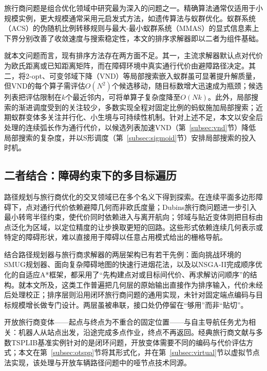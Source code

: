 \documentclass[lettersize,journal]{IEEEtran}
\begin{document}
旅行商问题是组合优化领域中研究最为深入的问题之一\cite{ref4,ref36}。精确算法通常仅适用于小规模实例，更大规模通常采用元启发式方法，如遗传算法\cite{ref19}与蚁群优化\cite{ref21,ref42}。蚁群系统（ACS）的伪随机比例转移规则\cite{ref22}与最大-最小蚁群系统（MMAS）的显式信息素上下界\cite{ref23}分别改善了收敛速度与搜索稳定性，本文的排序求解器即以二者为组件基础。

就本文问题而言，现有排序方法存在两方面不足。其一，主流求解器默认点对代价为欧氏距离或已知距离矩阵，而在障碍环境中真实通行代价由避障路径决定。其二，将2-opt、可变邻域下降（VND）等局部搜索嵌入蚁群虽可显著提升解质量\cite{ref24,ref25,ref43}，但VND的每个算子需评估$O(N^2)$个候选移动，随目标数增大迅速成为瓶颈；候选列表把评估限制在$k$个最近邻内，可将单算子复杂度降至$O(Nk)$\cite{ref26}。此外，局部搜索的渐进调度受到的关注较少，多数实现全程对固定比例的蚂蚁施加局部搜索；近期蚁群变体多关注并行化、小生境与可持续性机制\cite{ref27,ref28,ref29,ref30}。针对上述不足，本文以安全后处理的连续弧长作为通行代价，以候选列表加速VND（第~\ref{subsec:vnd}节）降低局部搜索的复杂度，并以S形调度（第~\ref{subsec:sigmoid}节）安排局部搜索的投入时机。

\subsection{二者结合：障碍约束下的多目标遍历}

路径规划与旅行商优化的交叉领域已在多个名义下得到探索\cite{ref4,ref36}。在连续平面多边形障碍下，点对通行代价依赖避障几何而非欧氏度量\cite{ref39}；Dubins旅行商问题进一步引入最小转弯半径约束，使代价同时依赖进入与离开航向；邻域与贴近变体则把目标由点泛化为区域，以定位精度的让步换取更短的回路\cite{ref36,ref40,ref46}。这些形式依赖连续几何表示或特定的障碍形状，难以直接用于障碍以任意占用模式给出的栅格导航。

结合路径规划器与旅行商求解器的两层架构已有若干先例：面向挑战环境的SMUG规划器\cite{ref1}、面向复杂障碍地图的快速行进烟花法\cite{ref2}，以及以NSGA-II完成顺序优化的自适应A*框架\cite{ref18}，都采用了“先构建点对或目标间代价、再求解访问顺序”的结构。就本文所及，这类工作普遍把几何层的原始输出直接作为排序输入，代价未经后处理校正；排序层则沿用闭环旅行商问题的通用实现，未针对固定端点编码与目标规模增长做专门设计。两层虽被串联，接口处仍停留在“够用”而非“贴切”。

开放旅行商变体——起点与终点为不重合的固定位置——与自主导航任务尤为相关：机器人从站点出发，沿途完成多点作业，终点不再返回。经典旅行商文献与多数TSPLIB基准实例针对的是闭环问题，开放变体需要不同的编码与代价评估方式；本文在第~\ref{subsec:otspp}节将其形式化，并在第~\ref{subsec:virtual}节以虚拟节点法实现，该处理与开放车辆路径问题中的哑节点技术同源\cite{ref32}。
\end{document}
